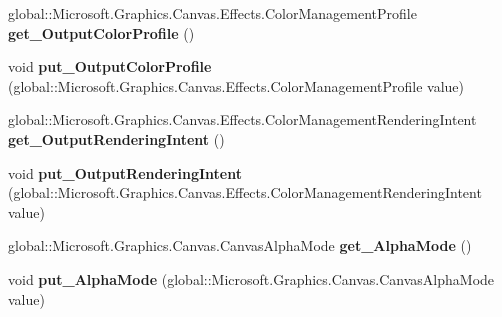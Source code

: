 \begin{DoxyCompactItemize}
global\+::\+Microsoft.\+Graphics.\+Canvas.\+Effects.\+Color\+Management\+Profile {\bfseries get\+\_\+\+Output\+Color\+Profile} ()
\item 
\mbox{\label{class_microsoft_1_1_graphics_1_1_canvas_1_1_effects_1_1_color_management_effect_a8cc3db4456f5009c8bb5932d1ba34690}} 
void {\bfseries put\+\_\+\+Output\+Color\+Profile} (global\+::\+Microsoft.\+Graphics.\+Canvas.\+Effects.\+Color\+Management\+Profile value)
\item 
\mbox{\label{class_microsoft_1_1_graphics_1_1_canvas_1_1_effects_1_1_color_management_effect_ab3f873d532a7ac2daad8c8891c039b7b}} 
global\+::\+Microsoft.\+Graphics.\+Canvas.\+Effects.\+Color\+Management\+Rendering\+Intent {\bfseries get\+\_\+\+Output\+Rendering\+Intent} ()
\item 
\mbox{\label{class_microsoft_1_1_graphics_1_1_canvas_1_1_effects_1_1_color_management_effect_a18c1f342b105332ae8a95cb11dcba930}} 
void {\bfseries put\+\_\+\+Output\+Rendering\+Intent} (global\+::\+Microsoft.\+Graphics.\+Canvas.\+Effects.\+Color\+Management\+Rendering\+Intent value)
\item 
\mbox{\label{class_microsoft_1_1_graphics_1_1_canvas_1_1_effects_1_1_color_management_effect_a8345f14c6facbde7cb0800f962ecaa00}} 
global\+::\+Microsoft.\+Graphics.\+Canvas.\+Canvas\+Alpha\+Mode {\bfseries get\+\_\+\+Alpha\+Mode} ()
\item 
\mbox{\label{class_microsoft_1_1_graphics_1_1_canvas_1_1_effects_1_1_color_management_effect_a09ffed53f704cbca9f184fd3d5872f77}} 
void {\bfseries put\+\_\+\+Alpha\+Mode} (global\+::\+Microsoft.\+Graphics.\+Canvas.\+Canvas\+Alpha\+Mode value)
\item 
\mbox{\label{class_microsoft_1_1_graphics_1_1_canvas_1_1_effects_1_1_color_management_effect_a74e8b9b83a4d172f56e20953dd051a26}} 

\end{DoxyCompactItemize}
